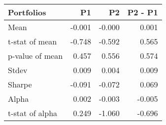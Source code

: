 \begin{tabular}{lrrr}
\toprule
Portfolios & P1 & P2 & P2 - P1 \\
\midrule
Mean & -0.001 & -0.000 & 0.001 \\
t-stat of mean & -0.748 & -0.592 & 0.565 \\
p-value of mean & 0.457 & 0.556 & 0.574 \\
Stdev & 0.009 & 0.004 & 0.009 \\
Sharpe & -0.091 & -0.072 & 0.069 \\
Alpha & 0.002 & -0.003 & -0.005 \\
t-stat of alpha & 0.249 & -1.060 & -0.696 \\
\bottomrule
\end{tabular}
